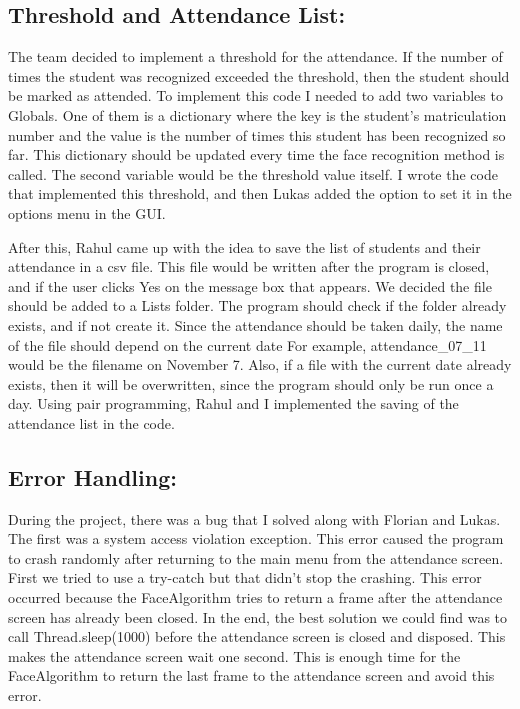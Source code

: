 \documentclass[12pt, a4paper]{article}
\begin{document}
\subsection{Threshold and Attendance List:}
The team decided to implement a threshold for the attendance. If the number of times the student was recognized exceeded the threshold, then the student should be marked as attended. To implement this code I needed to add two variables to Globals. One of them is a dictionary where the key is the student’s matriculation number and the value is the number of times this student has been recognized so far. This dictionary should be updated every time the face recognition method is called. The second variable would be the threshold value itself. I wrote the code that implemented this threshold, and then Lukas added the option to set it in the options menu in the GUI.

After this, Rahul came up with the idea to save the list of students and their attendance in a csv file. This file would be written after the program is closed, and if the user clicks Yes on the message box that appears. We decided the file should be added to a Lists folder. The program should check if the folder already exists, and if not create it. Since the attendance should be taken daily, the name of the file should depend on the current date For example, attendance\_07\_11 would be the filename on November 7. Also, if a file with the current date already exists, then it will be overwritten, since the program should only be run once a day. Using pair programming, Rahul and I implemented the saving of the attendance list in the code.

\subsection{Error Handling:}
During the project, there was a bug that I solved along with Florian and Lukas. The first was a system access violation exception. This error caused the program to crash randomly after returning to the main menu from the attendance screen. First we tried to use a try-catch but that didn’t stop the crashing. This error occurred because the FaceAlgorithm tries to return a frame after the attendance screen has already been closed. In the end, the best solution we could find was to call Thread.sleep(1000) before the attendance screen is closed and disposed. This makes the attendance screen wait one second. This is enough time for the FaceAlgorithm to return the last frame to the attendance screen and avoid this error.
\end{document}
